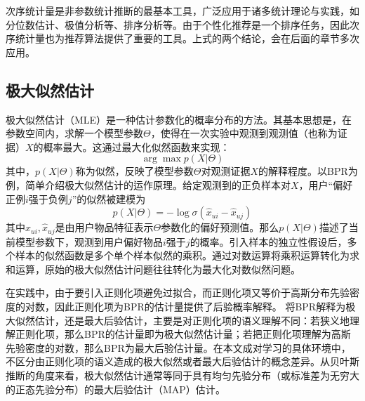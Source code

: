 次序统计量是非参数统计推断的最基本工具，广泛应用于诸多统计理论与实践，如分位数估计、极值分析等、排序分析等。由于个性化推荐是一个排序任务，因此次序统计量也为推荐算法提供了重要的工具。上式的两个结论，会在后面的章节多次应用。

\subsection{极大似然估计}
极大似然估计（MLE）是一种估计参数化的概率分布的方法。其基本思想是，在参数空间内，求解一个模型参数$\Theta$，使得在一次实验中观测到观测值（也称为证据）$X$的概率最大。这通过最大化似然函数来实现：
\[\arg \max p(X|\Theta)\]
其中，$p(X|\Theta)$称为似然，反映了模型参数$\Theta$对观测证据$X$的解释程度\cite{mou:2006}。以BPR为例，简单介绍极大似然估计的运作原理。给定观测到的正负样本对$X$，用户“偏好正例$i$强于负例$j$”的似然被建模为
\[p(X|\Theta) = -\log \sigma (\hat{x}_{ui} - \hat{x}_{uj})\]
其中$\hat{x}_{ui},\hat{x}_{uj}$是由用户物品特征表示$\Theta$参数化的偏好预测值。那么$p(X|\Theta)$描述了当前模型参数下，观测到用户偏好物品$i$强于$j$的概率。引入样本的独立性假设后，多个样本的似然函数是多个单个样本似然的乘积。通过对数运算将乘积运算转化为求和运算，原始的极大似然估计问题往往转化为最大化对数似然问题。

在实践中，由于要引入正则化项避免过拟合，而正则化项又等价于高斯分布先验密度的对数，因此正则化项为BPR的估计量提供了后验概率解释。
将BPR解释为极大似然估计，还是最大后验估计，主要是对正则化项的语义理解不同：若狭义地理解正则化项，那么BPR的估计量即为极大似然估计量；若把正则化项理解为高斯先验密度的对数，那么BPR为最大后验估计量。在本文成对学习的具体环境中，不区分由正则化项的语义造成的极大似然或者最大后验估计的概念差异。从贝叶斯推断的角度来看，极大似然估计通常等同于具有均匀先验分布（或标准差为无穷大的正态先验分布）的最大后验估计（MAP）估计\cite{beye:book}。






